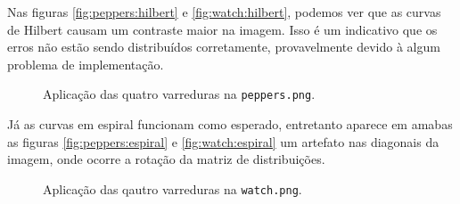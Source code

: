 Nas figuras \ref{fig:peppers:hilbert} e \ref{fig:watch:hilbert}, podemos ver que as curvas de Hilbert causam um contraste maior na imagem. Isso é um indicativo que os erros não estão sendo distribuídos corretamente, provavelmente devido à algum problema de implementação.

\begin{figure}[H]
    \centering
    
    \caption{Aplicação das quatro varreduras na \texttt{peppers.png}.}
    \label{fig:extra:peppers}
\end{figure}

Já as curvas em espiral funcionam como esperado, entretanto aparece em amabas as figuras \ref{fig:peppers:espiral} e \ref{fig:watch:espiral} um artefato nas diagonais da imagem, onde ocorre a rotação da matriz de distribuições.

\begin{figure}[H]
    \centering
    
    \caption{Aplicação das qautro varreduras na \texttt{watch.png}.}
    \label{fig:extra:watch}
\end{figure}
